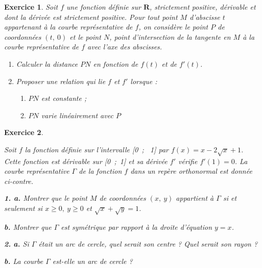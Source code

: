 \documentclass[12pt,a4paper,french]{article}
\newcommand{\R}{\mathbf{R}}
\theoremstyle{break}
\newtheorem{exercice}{Exercice}
\theoremstyle{nonumberplain}
\theoremstyle{nonumberbreak}
\begin{document}
\begin{exercice}
  Soit $f$ une fonction définie sur $\R$, strictement positive,
  dérivable et dont la dérivée est strictement positive. Pour tout point
  $M$ d'abscisse $t$ appartenant à la courbe représentative de $f$, on
  considère le point $P$ de coordonnées $(t,~ 0)$ et le point $N$, point
  d'intersection de la tangente en $M$ à la courbe représentative de $f$
  avec l'axe des abscisses.
  \begin{enumerate}
    \item Calculer la distance $PN$ en fonction de $f(t)$ et de $f'(t)$.
    \item Proposer une relation qui lie $f$ et $f'$ lorsque :
      \begin{enumerate}
        \item $PN$ est constante ;
        \item $PN$ varie linéairement avec $P$
      \end{enumerate}
  \end{enumerate}
\end{exercice}

\pagebreak

\begin{exercice}
  ~\\[-\baselineskip]
  \parbox[c]{0.5\textwidth}{Soit $f$ la fonction définie sur
    l'intervalle [0~;~ 1] par $f(x) = x - 2\sqrt{x} + 1$. Cette fonction
    est dérivable sur [0~;~1] et sa dérivée $f'$ vérifie $f'(1) = 0$. La
    courbe représentative
    $\Gamma$ de la fonction $f$ dans un repère orthonormal est donnée
    ci-contre.

    \textbf{1. a.}  Montrer que le point $M$ de coordonnées $(x,~y)$
    appartient à $\Gamma$ si et seulement si $x \geqslant 0,~ y
    \geqslant 0$ et $\sqrt{x} + \sqrt{y} = 1$.

    \textbf{b.} Montrer que $\Gamma$ est symétrique par rapport à la
  droite d'équation $y = x$.} \hfill
  \parbox[c]{0.5\textwidth}{\begin{center}
  \end{center}}

  \textbf{2.} \textbf{a.}  Si $\Gamma$ était un arc de cercle, quel
  serait son centre ? Quel serait son rayon ?

  \textbf{b.}  La courbe $\Gamma$ est-elle un arc de cercle ?
\end{exercice}
\end{document}
